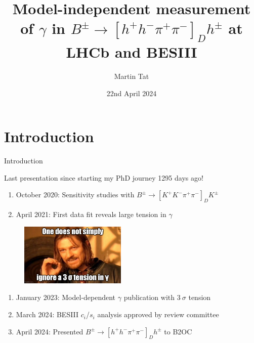\documentclass{beamer}
\title[$h^+h^-\pi^+\pi^-$]{Model-independent measurement of $\gamma$ in $B^\pm\to[h^+h^-\pi^+\pi^-]_Dh^\pm$ at LHCb and BESIII}
\author{Martin Tat}
\institute{Oxford LHCb}
\date{22nd April 2024}
\begin{document}
\begin{frame}
  \titlepage
\end{frame}


\section{Introduction}

\begin{frame}{Introduction}
  \begin{center}
    \large{Last presentation since starting my PhD journey 1295 days ago!}
  \end{center}
  \vspace{0.1cm}
  \begin{enumerate}
    \setlength\itemsep{0.7em}
    \item{October 2020: Sensitivity studies with $B^\pm\to [K^+K^-\pi^+\pi^-]_DK^\pm$}
    \item{April 2021: First data fit reveals large tension in $\gamma$}
  \end{enumerate}
  \begin{figure}
    \centering
    \includegraphics[width = 0.45\textwidth]{Plots/GammaTensionMeme.jpg}
  \end{figure}
  \begin{enumerate}
    \setlength\itemsep{0.7em}
    \setcounter{enumi}{3}
    \item{January 2023: Model-dependent $\gamma$ publication with $3~\sigma$ tension}
    \item{March 2024: BESIII $c_i$/$s_i$ analysis approved by review committee}
    \item{April 2024: Presented $B^\pm\to [h^+h^-\pi^+\pi^-]_Dh^\pm$ to B2OC}
  \end{enumerate}
\end{frame}
\end{document}
